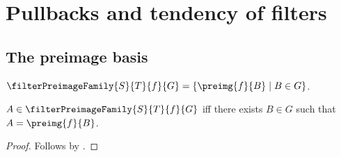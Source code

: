 \section{Pullbacks and tendency of filters}



\subsection{The preimage basis}

\begin{definition}\label{filter_preimage_family}
    $\filterPreimageFamily{S}{T}{f}{G}
        =\{\preimg{f}{B}\mid B\in G\}$.
\end{definition}

\begin{proposition}\label{filter_preimage_family_iff}
    $A\in\filterPreimageFamily{S}{T}{f}{G}$ iff
        there exists $B\in G$ such that $A=\preimg{f}{B}$.
\end{proposition}
\begin{proof}
    Follows by .
\end{proof}

